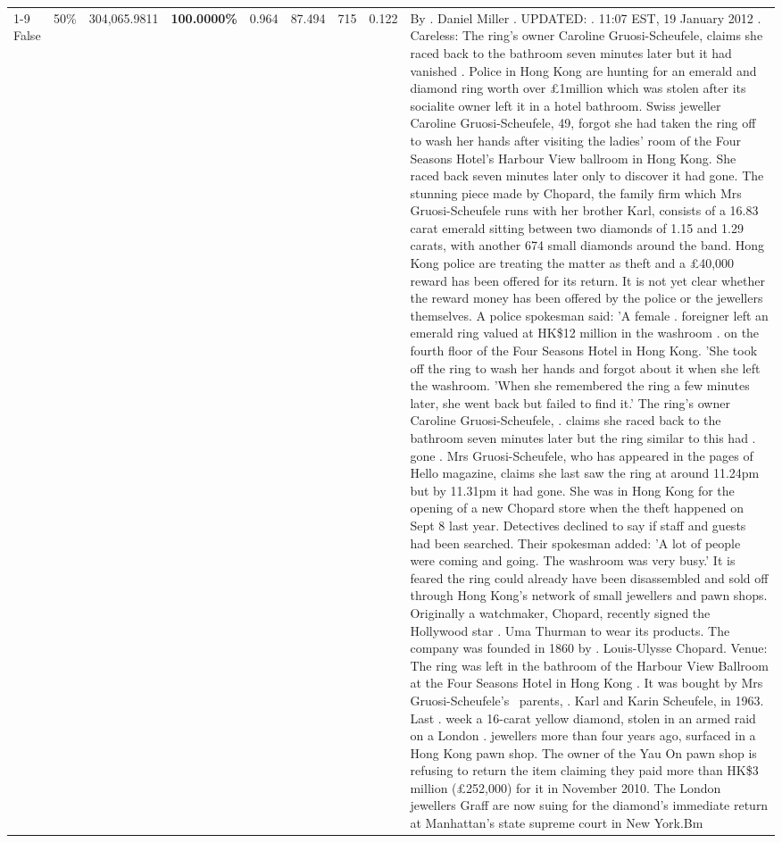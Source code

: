 \begin{table}[H]
\begin{tabular}{lllrlllll}
\cline{1-9} \cline{2-9}
False & 50\% & \color{red} 304,065.9811 & \bfseries \color{red} 100.0000\% & 0.964 & 87.494 & 715 & 0.122 & By . Daniel Miller . UPDATED: . 11:07 EST, 19 January 2012 . Careless: The ring's owner Caroline Gruosi-Scheufele, claims she raced back to the bathroom seven minutes later but it had vanished . Police in Hong Kong are hunting for an emerald and diamond ring worth over £1million which was stolen after its socialite owner left it in a hotel bathroom. Swiss jeweller Caroline Gruosi-Scheufele, 49, forgot she had taken the ring off to wash her hands after visiting the ladies' room of the Four Seasons Hotel's Harbour View ballroom in Hong Kong. She raced back seven minutes later only to discover it had gone. The stunning piece made by Chopard, the family firm which Mrs Gruosi-Scheufele runs with her brother Karl, consists of a 16.83 carat emerald sitting between two diamonds of 1.15 and 1.29 carats, with another 674 small diamonds around the band. Hong Kong police are treating the matter as theft and a £40,000 reward has been offered for its return. It is not yet clear whether the reward money has been offered by the police or the jewellers themselves. A police spokesman said: 'A female . foreigner left an emerald ring valued at HK\$12 million in the washroom . on the fourth floor of the Four Seasons Hotel in Hong Kong. 'She took off the ring to wash her hands and forgot about it when she left the washroom. 'When she remembered the ring a few minutes later, she went back but failed to find it.' The ring's owner Caroline Gruosi-Scheufele, . claims she raced back to the bathroom seven minutes later but the ring similar to this had . gone . Mrs Gruosi-Scheufele, who has appeared in the pages of Hello magazine, claims she last saw the ring at around 11.24pm but by 11.31pm it had gone. She was in Hong Kong for the opening of a new Chopard store when the theft happened on Sept 8 last year. Detectives declined to say if staff and guests had been searched. Their spokesman added: 'A lot of people were coming and going. The washroom was very busy.' It is feared the ring could already have been disassembled and sold off through Hong Kong's network of small jewellers and pawn shops. Originally a watchmaker, Chopard, recently signed the Hollywood star . Uma Thurman to wear its products. The company was founded in 1860 by . Louis-Ulysse Chopard. Venue: The ring was left in the bathroom of the Harbour View Ballroom at the Four Seasons Hotel in Hong Kong . It was bought by Mrs Gruosi-Scheufele's  parents, . Karl and Karin Scheufele, in 1963. Last . week a 16-carat yellow diamond, stolen in an armed raid on a London . jewellers more than four years ago, surfaced in a Hong Kong pawn shop. The owner of the Yau On pawn shop is refusing to return the item claiming they paid more than HK\$3 million (£252,000) for it in November 2010. The London jewellers Graff are now suing for the diamond’s immediate return at Manhattan’s state supreme court in New York.Bm \\

\end{tabular}
\end{table}
